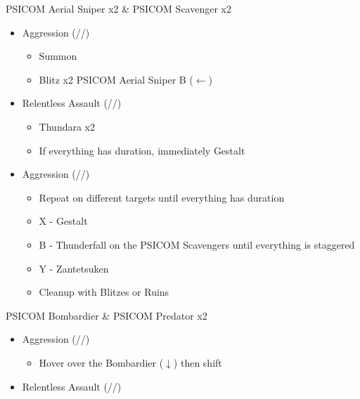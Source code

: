 \begin{multicols}{2}
  \renewcommand{\first}{[1] Aggression (\com/\com/\rav)}
  \renewcommand{\second}{[2] Relentless Assault (\rav/\com/\rav)}
  \begin{battle}[0:20]{PSICOM Aerial Sniper x2 \& PSICOM Scavenger x2}
    \begin{itemize}
      \item \first
            \begin{itemize}
              \item Summon
              \item Blitz x2 PSICOM Aerial Sniper B ($\leftarrow$)
            \end{itemize}
      \item \second
            \begin{itemize}
              \item Thundara x2
              \item If everything has duration, immediately Gestalt
            \end{itemize}
      \item \first
            \begin{itemize}
              \item Repeat on different targets until everything has duration
              \item X - Gestalt
              \item B - Thunderfall on the PSICOM Scavengers until everything is staggered
              \item Y - Zantetsuken
              \item Cleanup with Blitzes or Ruins
            \end{itemize}
    \end{itemize}
     
  \end{battle}
  \begin{battle}[0:26]{PSICOM Bombardier \& PSICOM Predator x2}
    \begin{itemize}
      \item \first
            \begin{itemize}
              \item Hover over the Bombardier ($\downarrow$) then shift
            \end{itemize}
      \item \second
            \begin{itemize}

\end{itemize}
\end{itemize}
\end{battle}
\end{multicols}
